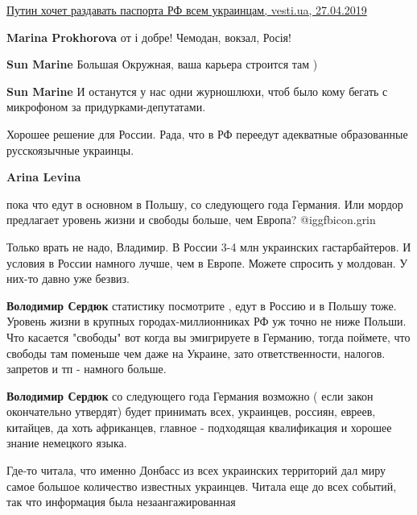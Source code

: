 \begin{itemize}
\href{https://vesti.ua/strana/334438-putin-khochet-razdavat-pasporta-rf-vsem-ukraintsam}{%
Путин хочет раздавать паспорта РФ всем украинцам, vesti.ua, 27.04.2019%
}

\begin{itemize} %
\textbf{Marina Prokhorova} от і добре! Чемодан, вокзал, Росія!

\textbf{Sun Marine} Большая Окружная, ваша карьера строится там )

\textbf{Sun Marine} И останутся у нас одни журношлюхи, чтоб было кому бегать с микрофоном за придурками-депутатами.
\end{itemize} %

Хорошее решение для России. Рада, что в РФ переедут адекватные образованные русскоязычные украинцы.

\begin{itemize} %
\textbf{Arina Levina} 

пока что едут в основном в Польшу, со следующего года Германия. Или мордор
предлагает уровень жизни и свободы больше, чем Европа? @igg{fbicon.grin} 


Только врать не надо, Владимир. В России 3-4 млн украинских гастарбайтеров. И
условия в России намного лучше, чем в Европе. Можете спросить у молдован. У
них-то давно уже безвиз.


\textbf{Володимир Сердюк} статистику посмотрите , едут в Россию и в Польшу тоже. Уровень жизни в крупных городах-миллионниках РФ уж точно не ниже Польши. Что касается "свободы" вот когда вы эмигрируете в Германию, тогда поймете, что свободы там поменьше чем даже на Украине, зато ответственности, налогов. запретов и тп - намного больше.

\textbf{Володимир Сердюк} со следующего года Германия возможно ( если закон окончательно утвердят) будет принимать всех, украинцев, россиян, евреев, китайцев, да хоть африканцев, главное - подходящая квалификация и хорошее знание немецкого языка.
\end{itemize} %


Где-то читала, что именно Донбасс из всех украинских территорий дал миру самое
большое количество известных украинцев. Читала еще до всех событий, так что
информация была незаангажированная


\end{itemize}
